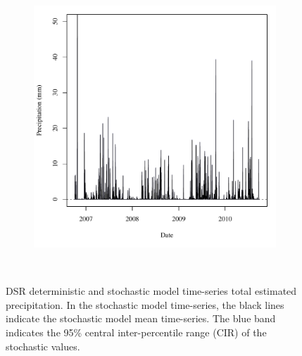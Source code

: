 \begin{landscape}
\begin{figure}
\begin{subfigure}{0.7\textwidth}
			\includegraphics[width=\tableCustomSize]{"Figures/Results_DSR/Stochastic/A Precip"}
		\end{subfigure}\\
		\caption[DSR deterministic and stochastic model time-series total estimated precipitation.]{DSR deterministic and stochastic model time-series total estimated precipitation.  In the stochastic model time-series, the black lines indicate the stochastic model mean time-series.  The blue band indicates the 95\% central inter-percentile range (CIR) of the stochastic values.}
		\label{fig:reachPrecip_DS}
	\end{figure}
\end{landscape}

\subtabletop
\begin{table}[htbp]
	\centering
	\caption[USR deterministic and stochastic model time-series total estimated precipitation numeric results.]{USR deterministic and stochastic model time-series total estimated precipitation numeric results.  Total daily precipitation  rates are presented in units of \si{\milli\meter} (\si{\inch}).}
	\label{tab:reachPrecip_US}
	
\end{table}
\tablevspace
\begin{table}[htbp]
	\centering
	\caption[DSR deterministic and stochastic model time-series total estimated precipitation numeric results.]{DSR deterministic and stochastic model time-series total estimated precipitation numeric results.    Total daily precipitation  rates are presented in units of \si{\milli\meter} (\si{\inch}).}
	\label{tab:reachPrecip_DS}
	
\end{table}

